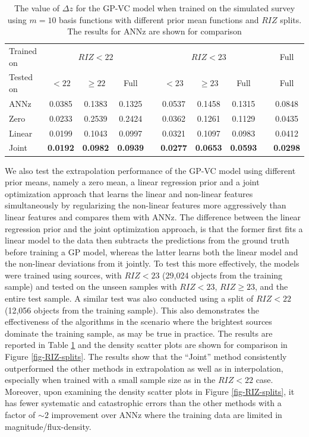 \documentclass[useAMS,usenatbib,fleqn]{mn2e}
\begin{document}
 \begin{table}
\caption{The value of $\Delta z$ for the GP-VC model when trained on the simulated survey using $m=10$ basis functions with different prior mean functions and $RIZ$ splits. The results for {\sc ANNz} are shown for comparison}
\begin{center}
  \begin{tabular}{| l | c | c | c | c | c | c | c | c | c |}
  	Trained on				& 	\multicolumn{3}{|c|}{ $RIZ<22$}				&	& 	\multicolumn{3}{c}{$RIZ<23$}  &  & Full\\ \cline{2-4} \cline{6-8} \cline{10-10} 
     	Tested on					&	$<22$			&	$\ge 22$		&	Full				&	&	$<23$	&	$\ge 23$	&	Full	& & Full\\	\hline
	{\sc ANNz}						&	0.0385			&	0.1383			&	0.1325			&	&	0.0537&	0.1458	&	0.1315 &  & 0.0848				\\
	Zero						&	0.0233			&	0.2539			&	0.2424			&	&	0.0362&	0.1261	&	0.1129 &  & 0.0435				\\
	Linear						&	0.0199			&	0.1043			&	0.0997			&	&	0.0321	&	0.1097	&	0.0983 &  & 0.0412				\\
	Joint						&	\textbf{0.0192}	&	\textbf{0.0982}	&	\textbf{0.0939}	&	&	\textbf{0.0277}	&	\textbf{0.0653}	&	\textbf{0.0593} &  & \textbf{0.0298}	\\	\hline
  \end{tabular}
\end{center}
\label{table-RIZ-splits}
\end{table}

We also test the extrapolation performance of the GP-VC model using different prior means, namely a zero mean, a linear regression prior and a joint optimization approach that learns the linear and non-linear features simultaneously by regularizing the non-linear features more aggressively than linear features and compares them with {\sc ANNz}. The difference between the linear regression prior and the joint optimization approach, is that the former first fits a linear model to the data then subtracts the predictions from the ground truth before training a GP model, whereas the latter learns both the linear model and the non-linear deviations from it jointly. To test this more effectively, the models were trained using sources, with $RIZ<23$ (29,024 objects from the training sample) and tested on the unseen samples with $RIZ<23$, $RIZ\ge23$, and the entire test sample. A similar test was also conducted using a split of $RIZ<22$ (12,056 objects from the training sample). This also demonstrates the effectiveness of the algorithms in the scenario where the brightest sources dominate the training sample, as may be true in practice. The results are reported in Table \ref{table-RIZ-splits} and the density scatter plots are shown for comparison in Figure \ref{fig-RIZ-splits}. The results show that the ``Joint'' method consistently outperformed the other methods in extrapolation as well as in interpolation, especially when trained with a small sample size as in the $RIZ<22$ case. Moreover, upon examining the density scatter plots in Figure \ref{fig-RIZ-splits}, it has fewer systematic and catastrophic errors than the other methods with a factor of $\sim 2$ improvement over {\sc ANNz} where the training data are limited in magnitude/flux-density.
\end{document}
